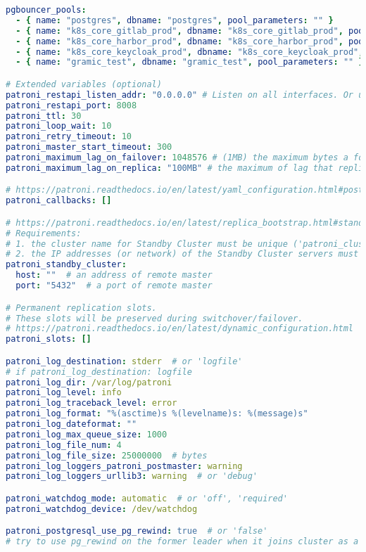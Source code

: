 \begin{flushleft}
\begin{lstlisting}[language=yaml, caption=Testsystem - Deployment - main.yml,captionpos=b,label={lst:testsystem-deployment-main.yml},breaklines=true]
pgbouncer_pools:
  - { name: "postgres", dbname: "postgres", pool_parameters: "" }
  - { name: "k8s_core_gitlab_prod", dbname: "k8s_core_gitlab_prod", pool_parameters: "" }
  - { name: "k8s_core_harbor_prod", dbname: "k8s_core_harbor_prod", pool_parameters: "" }
  - { name: "k8s_core_keycloak_prod", dbname: "k8s_core_keycloak_prod", pool_parameters: "" }
  - { name: "gramic_test", dbname: "gramic_test", pool_parameters: "" }

# Extended variables (optional)
patroni_restapi_listen_addr: "0.0.0.0" # Listen on all interfaces. Or use "{{ inventory_hostname }}" to listen on a specific IP address.
patroni_restapi_port: 8008
patroni_ttl: 30
patroni_loop_wait: 10
patroni_retry_timeout: 10
patroni_master_start_timeout: 300
patroni_maximum_lag_on_failover: 1048576 # (1MB) the maximum bytes a follower may lag to be able to participate in leader election.
patroni_maximum_lag_on_replica: "100MB" # the maximum of lag that replica can be in order to be available for read-only queries.

# https://patroni.readthedocs.io/en/latest/yaml_configuration.html#postgresql
patroni_callbacks: []

# https://patroni.readthedocs.io/en/latest/replica_bootstrap.html#standby-cluster
# Requirements:
# 1. the cluster name for Standby Cluster must be unique ('patroni_cluster_name' variable)
# 2. the IP addresses (or network) of the Standby Cluster servers must be added to the pg_hba.conf of the Main Cluster ('postgresql_pg_hba' variable).
patroni_standby_cluster:
  host: ""  # an address of remote master
  port: "5432"  # a port of remote master

# Permanent replication slots.
# These slots will be preserved during switchover/failover.
# https://patroni.readthedocs.io/en/latest/dynamic_configuration.html
patroni_slots: []

patroni_log_destination: stderr  # or 'logfile'
# if patroni_log_destination: logfile
patroni_log_dir: /var/log/patroni
patroni_log_level: info
patroni_log_traceback_level: error
patroni_log_format: "%(asctime)s %(levelname)s: %(message)s"
patroni_log_dateformat: ""
patroni_log_max_queue_size: 1000
patroni_log_file_num: 4
patroni_log_file_size: 25000000  # bytes
patroni_log_loggers_patroni_postmaster: warning
patroni_log_loggers_urllib3: warning  # or 'debug'

patroni_watchdog_mode: automatic  # or 'off', 'required'
patroni_watchdog_device: /dev/watchdog

patroni_postgresql_use_pg_rewind: true  # or 'false'
# try to use pg_rewind on the former leader when it joins cluster as a replica.


\end{lstlisting}
\end{flushleft}
